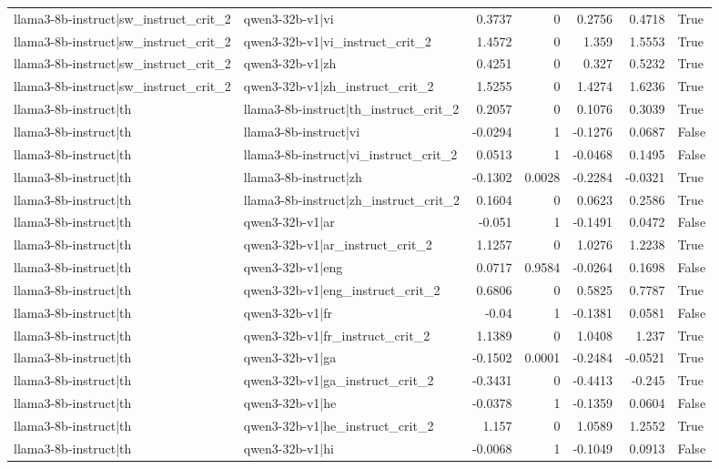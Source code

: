 \begin{table}
\begin{tabular}{l l r r r r l}
llama3-8b-instruct|sw_instruct_crit_2 & qwen3-32b-v1|vi & 0.3737 & 0 & 0.2756 & 0.4718 & True \\
llama3-8b-instruct|sw_instruct_crit_2 & qwen3-32b-v1|vi_instruct_crit_2 & 1.4572 & 0 & 1.359 & 1.5553 & True \\
llama3-8b-instruct|sw_instruct_crit_2 & qwen3-32b-v1|zh & 0.4251 & 0 & 0.327 & 0.5232 & True \\
llama3-8b-instruct|sw_instruct_crit_2 & qwen3-32b-v1|zh_instruct_crit_2 & 1.5255 & 0 & 1.4274 & 1.6236 & True \\
llama3-8b-instruct|th & llama3-8b-instruct|th_instruct_crit_2 & 0.2057 & 0 & 0.1076 & 0.3039 & True \\
llama3-8b-instruct|th & llama3-8b-instruct|vi & -0.0294 & 1 & -0.1276 & 0.0687 & False \\
llama3-8b-instruct|th & llama3-8b-instruct|vi_instruct_crit_2 & 0.0513 & 1 & -0.0468 & 0.1495 & False \\
llama3-8b-instruct|th & llama3-8b-instruct|zh & -0.1302 & 0.0028 & -0.2284 & -0.0321 & True \\
llama3-8b-instruct|th & llama3-8b-instruct|zh_instruct_crit_2 & 0.1604 & 0 & 0.0623 & 0.2586 & True \\
llama3-8b-instruct|th & qwen3-32b-v1|ar & -0.051 & 1 & -0.1491 & 0.0472 & False \\
llama3-8b-instruct|th & qwen3-32b-v1|ar_instruct_crit_2 & 1.1257 & 0 & 1.0276 & 1.2238 & True \\
llama3-8b-instruct|th & qwen3-32b-v1|eng & 0.0717 & 0.9584 & -0.0264 & 0.1698 & False \\
llama3-8b-instruct|th & qwen3-32b-v1|eng_instruct_crit_2 & 0.6806 & 0 & 0.5825 & 0.7787 & True \\
llama3-8b-instruct|th & qwen3-32b-v1|fr & -0.04 & 1 & -0.1381 & 0.0581 & False \\
llama3-8b-instruct|th & qwen3-32b-v1|fr_instruct_crit_2 & 1.1389 & 0 & 1.0408 & 1.237 & True \\
llama3-8b-instruct|th & qwen3-32b-v1|ga & -0.1502 & 0.0001 & -0.2484 & -0.0521 & True \\
llama3-8b-instruct|th & qwen3-32b-v1|ga_instruct_crit_2 & -0.3431 & 0 & -0.4413 & -0.245 & True \\
llama3-8b-instruct|th & qwen3-32b-v1|he & -0.0378 & 1 & -0.1359 & 0.0604 & False \\
llama3-8b-instruct|th & qwen3-32b-v1|he_instruct_crit_2 & 1.157 & 0 & 1.0589 & 1.2552 & True \\
llama3-8b-instruct|th & qwen3-32b-v1|hi & -0.0068 & 1 & -0.1049 & 0.0913 & False \\

\end{tabular}
\end{table}
